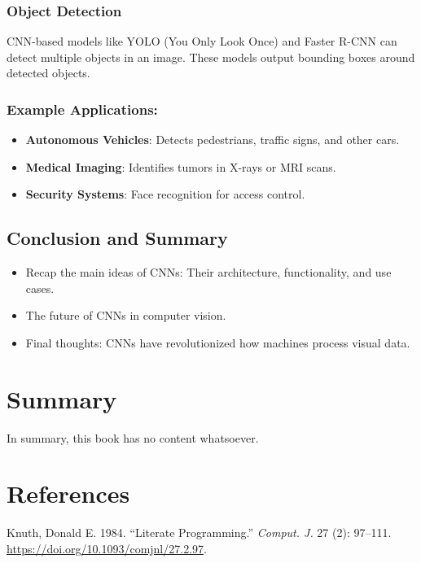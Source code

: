 \documentclass[
  letterpaper,
  DIV=11,
  numbers=noendperiod]{scrreprt}
\providecommand{\tightlist}{%
  \setlength{\itemsep}{0pt}\setlength{\parskip}{0pt}}\usepackage{longtable,booktabs,array}
\newlength{\cslhangindent}
\newenvironment{CSLReferences}[2] %
 {\begin{list}{}{%
  \setlength{\itemindent}{0pt}
  \setlength{\leftmargin}{0pt}
  \setlength{\parsep}{0pt}
  \ifodd #1
   \setlength{\leftmargin}{\cslhangindent}
   \setlength{\itemindent}{-1\cslhangindent}
  \fi
  \setlength{\itemsep}{#2\baselineskip}}}
 {\end{list}}
\begin{document}
\subsection{Object Detection}\label{object-detection}

CNN-based models like YOLO (You Only Look Once) and Faster R-CNN can
detect multiple objects in an image. These models output bounding boxes
around detected objects.

\subsection{Example Applications:}\label{example-applications}

\begin{itemize}
\tightlist
\item
  \textbf{Autonomous Vehicles}: Detects pedestrians, traffic signs, and
  other cars.
\item
  \textbf{Medical Imaging}: Identifies tumors in X-rays or MRI scans.
\item
  \textbf{Security Systems}: Face recognition for access control.
\end{itemize}

\section{Conclusion and Summary}\label{conclusion-and-summary}

\begin{itemize}
\tightlist
\item
  Recap the main ideas of CNNs: Their architecture, functionality, and
  use cases.
\item
  The future of CNNs in computer vision.
\item
  Final thoughts: CNNs have revolutionized how machines process visual
  data.
\end{itemize}


\chapter{Summary}\label{summary-3}

In summary, this book has no content whatsoever.


\chapter*{References}\label{references-2}


\label{refs}
\begin{CSLReferences}{1}{0}
Knuth, Donald E. 1984. {``Literate Programming.''} \emph{Comput. J.} 27
(2): 97--111. \url{https://doi.org/10.1093/comjnl/27.2.97}.

\end{CSLReferences}
\end{document}
